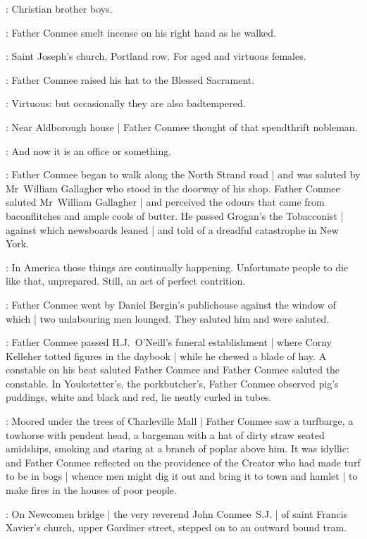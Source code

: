 \conmeeint:
Christian brother boys.

:
Father Conmee smelt incense on his right hand as he walked.

\conmeeint:
Saint Joseph's church, Portland row.%
For aged and virtuous females.

:
Father Conmee raised his hat to the Blessed Sacrament.

\conmeeint:
Virtuous: but occasionally they are also badtempered.

:
Near Aldborough house |
Father Conmee thought of that spendthrift nobleman.

\conmeeint:
And now it is an office or something.

:
Father Conmee began to walk along the North Strand road |
and was saluted by Mr~William Gallagher
who stood in the doorway of his shop.
Father Conmee saluted Mr~William Gallagher |
and perceived the odours
that came from bacon\-flitches and ample cools of butter.
He passed Grogan's the Tobacconist |
against which newsboards leaned |
and told of a dreadful catastrophe%
in New York.

\conmeeint:
In America those things are continually happening.
Unfortunate people to die like that, unprepared.
Still, an act of perfect contrition.

:
Father Conmee went by Daniel Bergin's publichouse
against the window of which |
two unlabouring men lounged.
They saluted him and were saluted.

:
Father Conmee passed H.J.~O'Neill's funeral establishment |
where Corny Kelleher totted figures in the daybook |
while he chewed a blade of hay.
A constable on his beat saluted Father Conmee
and Father Conmee saluted the constable.
In Youkstetter's, the porkbutcher's,
Father Conmee observed pig's puddings,%
white and black and red,
lie neatly curled in tubes.

:
Moored under the trees of Charleville Mall |
Father Conmee saw a turfbarge,
a towhorse with pendent head,
a bargeman with a hat of dirty straw seated amidships,
smoking and staring at a branch of poplar above him.
It was idyllic:
and Father Conmee reflected on the providence of the Creator
who had made turf to be in bogs |
whence men might dig it out and bring it to town and hamlet |
to make fires in the houses of poor people.

:
On Newcomen bridge |
the very reverend John Conmee~S.J. |
of saint Francis Xavier's church, upper Gardiner street,
stepped on to an outward bound tram.

